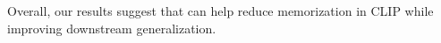 Overall, our results suggest that \ours can help reduce memorization in CLIP while improving downstream generalization.
















    



